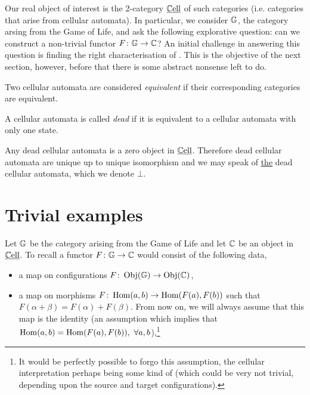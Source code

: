 \documentclass[11pt,a4paper]{amsart}
\begin{document}
Our real object of interest is the 2-category $\operatorname{\underline{\mathbb{C}ell}}$  of such categories (i.e. categories that arise from cellular automata). In particular, we consider $\mathbb{G}$, the category arsing from the Game of Life, and ask the following explorative question: can we construct a non-trivial functor $F \colon \mathbb{G} \to \mathbb{C}$? An initial challenge in answering this question is finding the right characterisation of . This is the objective of the next section, however, before that there is some abstract nonsense left to do.

\begin{DEF}
  \label{def:equivalent-automata}
  Two cellular automata are considered \emph{equivalent} if their corresponding categories are equivalent. 
\end{DEF}

\begin{DEF}
  \label{def:dead-automata}
  A cellular automata is called \emph{dead} if it is equivalent to a cellular automata with only one state. 
\end{DEF}

\begin{PROP}
  \label{prop:dead-zero}
  Any dead cellular automata is a zero object in $\operatorname{\underline{\mathbb{C}ell}}$.  Therefore dead cellular automata are unique up to unique isomorphism and we may speak of \href{https://ncatlab.org/nlab/show/generalized+the}{the} dead cellular automata, which we denote $\bot$.
\end{PROP}


\section{Trivial examples}

Let $\mathbb{G}$ be the category arising from the Game of Life and let $\mathbb{C}$ be an object in $\operatorname{\underline{\mathbb{C}ell}}$. To recall a functor $F\colon \mathbb{G} \to \mathbb{C}$ would consist of the following data,
\begin{itemize}
\item a map on configurations $F \colon \operatorname{Obj}(\mathbb{G}) \to \operatorname{Obj}(\mathbb{C})$,
\item a map on morphisms $F \colon \operatorname{Hom}(a,b) \to \operatorname{Hom}(F(a),F(b))$ such that $F(\alpha + \beta) = F(\alpha) + F(\beta)$. From now on, we will always assume that this map is the identity (an assumption which implies that $\operatorname{Hom}(a,b) = \operatorname{Hom}(F(a),F(b)), \ \forall a,b$),\footnote{It would be perfectly possible to forgo this assumption, the cellular interpretation perhaps being some kind of  (which could be very not trivial, depending upon the source and target configurations). }
\end{itemize}
\end{document}
